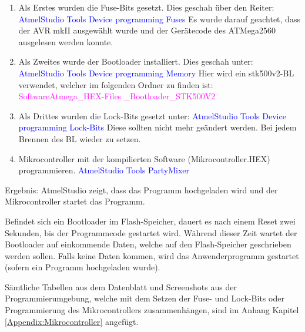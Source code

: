 \begin{enumerate}
\item Als Erstes wurden die Fuse-Bits gesetzt. Dies geschah über den Reiter:\newline
\textcolor{blue}{AtmelStudio \textrightarrow Tools \textrightarrow Device programming \textrightarrow Fuses} \newline
Es wurde darauf geachtet, dass der AVR mkII ausgewählt wurde und der Gerätecode des ATMega2560 ausgelesen werden konnte.\newline

\item Als Zweites wurde der Bootloader installiert. Dies geschah unter:\newline
\textcolor{blue}{AtmelStudio \textrightarrow Tools \textrightarrow Device programming \textrightarrow Memory} \newline
Hier wird ein stk500v2-BL verwendet, welcher im folgenden Ordner zu finden ist:\newline
\textcolor{magenta}{Software\textrightarrow Atmega\_HEX-Files \_Bootloader\_STK500V2}\newline
\item Als Drittes wurden die Lock-Bits gesetzt unter:\newline
\textcolor{blue}{AtmelStudio \textrightarrow Tools \textrightarrow Device programming \textrightarrow Lock-Bits}\newline
Diese sollten nicht mehr geändert werden. Bei jedem Brennen des BL wieder zu setzen.\newline
\item Mikrocontroller mit der kompilierten Software (Mikrocontroller.HEX) programmieren.\newline
\textcolor{blue}{AtmelStudio \textrightarrow Tools \textrightarrow PartyMixer}\newline
\end{enumerate}

Ergebnis: AtmelStudio zeigt, dass das Programm hochgeladen wird und der Mikrocontroller startet das Programm.

Befindet sich ein Bootloader im Flash-Speicher, dauert es nach einem Reset zwei Sekunden, bis der Programmcode gestartet wird. Während dieser Zeit wartet der Bootloader auf einkommende Daten, welche auf den Flash-Speicher geschrieben werden sollen. Falls keine Daten kommen, wird das Anwenderprogramm gestartet (sofern ein Programm hochgeladen wurde).

Sämtliche Tabellen aus dem Datenblatt und Screenshots aus der Programmierumgebung, welche mit dem Setzen der Fuse- und Lock-Bits oder Programmierung des Mikrocontrollers zusammenhängen, sind im Anhang Kapitel \ref{Appendix:Mikrocontroller} angefügt.